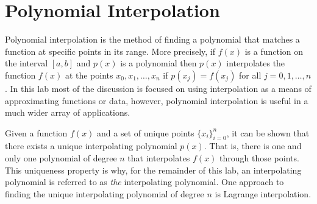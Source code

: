 \label{lab:Polynomial Interpolation}

\section*{Polynomial Interpolation}
Polynomial interpolation is the method of finding a polynomial that matches a function at specific points in its range.
More precisely, if $f(x)$ is a function on the interval $[a,b]$ and $p(x)$ is a polynomial then $p(x)$ interpolates the function $f(x)$ at the points $x_0,x_1,\dots ,x_n$ if $p(x_j)=f(x_j)$ for all $j=0,1,\dots,n$.
In this lab most of the discussion is focused on using interpolation as a means of approximating functions or data, however, polynomial interpolation is useful in a much wider array of applications.

Given a function $f(x)$ and a set of unique points $\{x_i\}_{i=0}^n$, it can be shown that there exists a unique interpolating polynomial $p(x)$.
That is, there is one and only one polynomial of degree $n$ that interpolates $f(x)$ through those points.
This uniqueness property is why, for the remainder of this lab, an interpolating polynomial is referred to as \emph{the} interpolating polynomial.
One approach to finding the unique interpolating polynomial of degree $n$ is Lagrange interpolation.

